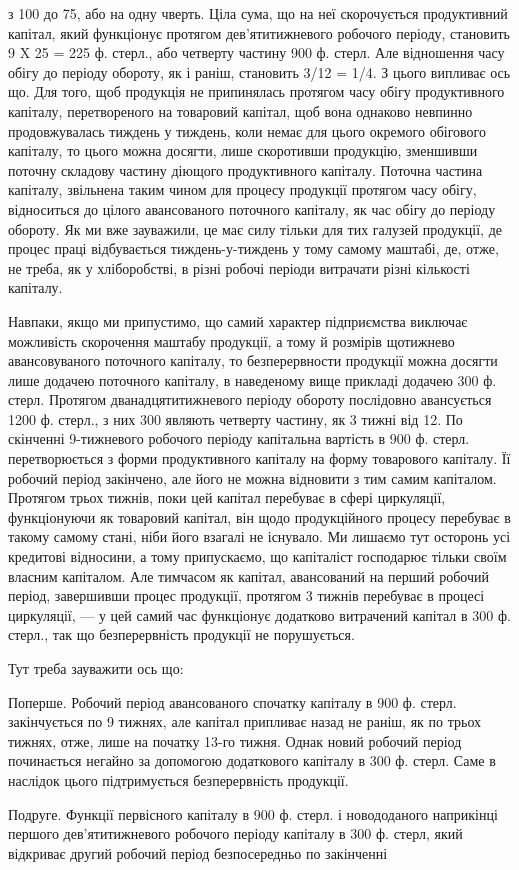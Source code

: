 \parcont{}  %
з 100 до 75, або на одну чверть. Ціла сума, що на неї скорочується
продуктивний капітал, який функціонує протягом дев’ятитижневого робочого
періоду, становить 9 X 25 = 225 ф. стерл., або четверту частину
900 ф. стерл. Але відношення часу обігу до періоду обороту, як і раніш,
становить 3/12 = 1/4. З цього випливає ось що. Для того, щоб продукція
не припинялась протягом часу обігу продуктивного капіталу, перетвореного
на товаровий капітал, щоб вона однаково невпинно продовжувалась тиждень
у тиждень, коли немає для цього окремого обігового капіталу, то
цього можна досягти, лише скоротивши продукцію, зменшивши поточну
складову частину діющого продуктивного капіталу. Поточна частина капіталу,
звільнена таким чином для процесу продукції протягом часу обігу,
відноситься до цілого авансованого поточного капіталу, як час обігу до
періоду обороту. Як ми вже зауважили, це має силу тільки для тих галузей
продукції, де процес праці відбувається тиждень-у-тиждень у
тому самому маштабі, де, отже, не треба, як у хліборобстві, в різні робочі
періоди витрачати різні кількості капіталу.

Навпаки, якщо ми припустимо, що самий характер підприємства виключає
можливість скорочення маштабу продукції, а тому й розмірів щотижнево
авансовуваного поточного капіталу, то безперервности продукції
можна досягти лише додачею поточного капіталу, в наведеному вище
прикладі додачею 300 ф. стерл. Протягом дванадцятитижневого періоду
обороту послідовно авансується 1200 ф. стерл., з них 300 являють четверту
частину, як 3 тижні від 12. По скінченні 9-тижневого робочого
періоду капітальна вартість в 900 ф. стерл. перетворюється з форми
продуктивного капіталу на форму товарового капіталу. Її робочий період
закінчено, але його не можна відновити з тим самим капіталом. Протягом
трьох тижнів, поки цей капітал перебуває в сфері циркуляції, функціонуючи
як товаровий капітал, він щодо продукційного процесу перебуває
в такому самому стані, ніби його взагалі не існувало. Ми лишаємо тут
осторонь усі кредитові відносини, а тому припускаємо, що капіталіст
господарює тільки своїм власним капіталом. Але тимчасом як капітал,
авансований на перший робочий період, завершивши процес продукції,
протягом 3 тижнів перебуває в процесі циркуляції, — у цей самий час
функціонує додатково витрачений капітал в 300 ф. стерл., так що безперервність
продукції не порушується.

Тут треба зауважити ось що:

Поперше. Робочий період авансованого спочатку капіталу в 900 ф.
стерл. закінчується по 9 тижнях, але капітал припливає назад не раніш,
як по трьох тижнях, отже, лише на початку 13-го тижня. Однак новий
робочий період починається негайно за допомогою додаткового капіталу
в 300 ф. стерл. Саме в наслідок цього підтримується безперервність
продукції.

Подруге. Функції первісного капіталу в 900 ф. стерл. і новододаного
наприкінці першого дев’ятитижневого робочого періоду капіталу в 300 ф.
стерл, який відкриває другий робочий період безпосередньо по закінченні
\parbreak{}  %
